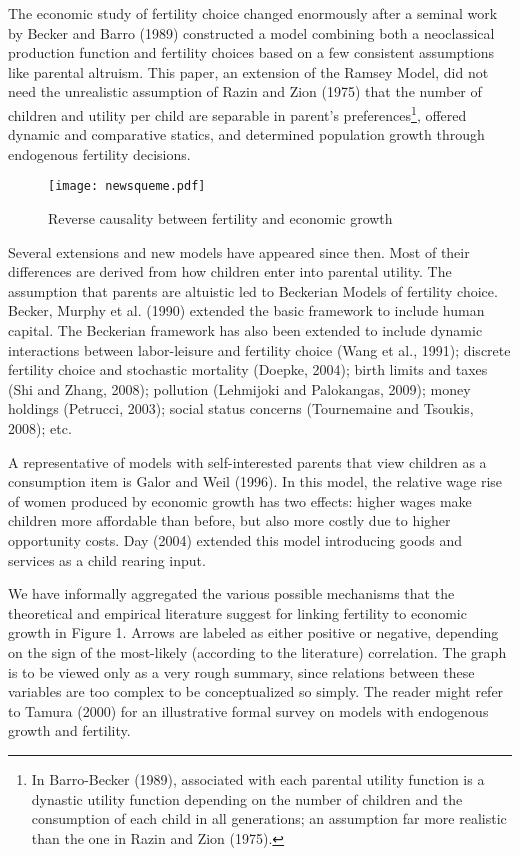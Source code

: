 \documentclass[12pt]{article}%
\begin{document}
The economic study of fertility choice changed enormously after a seminal work by Becker and Barro (1989) constructed a model combining both a neoclassical production function and fertility choices based on a few consistent assumptions like parental altruism. This paper, an extension of the Ramsey Model, did not need the unrealistic assumption of Razin and Zion (1975) that the number of children and utility per child are separable in parent's preferences\footnote{In Barro-Becker (1989), associated with each parental utility function is a dynastic utility function depending on the number of children and the consumption of each child in all generations; an assumption far more realistic than the one in Razin and Zion (1975).}, offered dynamic and comparative statics, and determined population growth through endogenous fertility decisions.
\begin{figure}[h]
\caption{Reverse causality between fertility and economic growth}
\centering
\texttt{[image: newsqueme.pdf]}
\label{tfrandle}
\end{figure}
Several extensions and new models have appeared since then. Most of their differences are derived from how children enter into parental utility. The assumption that parents are altuistic led to Beckerian Models of fertility choice. Becker, Murphy et al. (1990) extended the basic framework to include human capital. The Beckerian framework has also been extended to include dynamic interactions between labor-leisure and fertility choice (Wang et al., 1991); discrete fertility choice and stochastic mortality (Doepke, 2004); birth limits and taxes (Shi and Zhang, 2008); pollution (Lehmijoki and Palokangas, 2009); money holdings (Petrucci, 2003); social status concerns (Tournemaine and Tsoukis, 2008); etc.

A representative of models with self-interested parents that view children as a consumption item is Galor and Weil (1996). In this model, the relative wage rise of women produced by economic growth has two effects: higher wages make children more affordable than before, but also more costly due to higher opportunity costs. Day (2004) extended this model introducing goods and services as a child rearing input.

We have informally aggregated the various possible mechanisms that the theoretical and empirical literature suggest for linking fertility to economic growth in Figure 1. Arrows are labeled as either positive or negative, depending on the sign of the most-likely (according to the literature) correlation. The graph is to be viewed only as a very rough summary, since relations between these variables are too complex to be conceptualized so simply. The reader might refer to Tamura (2000) for an illustrative formal survey on models with endogenous growth and fertility.
\end{document}
